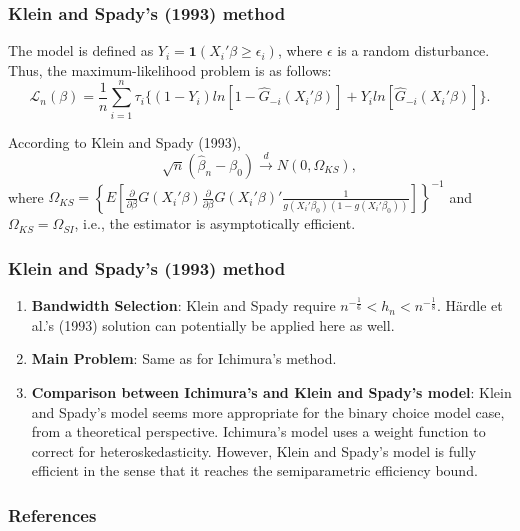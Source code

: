 \documentclass[11pt]{beamer}
\begin{document}
\begin{frame}[t]
    \frametitle{Klein and Spady's (1993) method}
The model is defined as $Y_i =  \mathbf{1}{(X_i'\beta \geq \epsilon_i)}$, where $\epsilon$ is a random disturbance.
Thus, the maximum-likelihood problem is as follows:
\begin{equation}
\mathcal{L}_n(\beta) = \frac{1}{n}\sum_{i=1}^n \tau_{i}\{ (1 - Y_i)ln[ 1 - \hat{G}_{-i}(X_i'\beta)] +  Y_iln[\hat{G}_{-i}(X_i'\beta)]\}.
\end{equation}
\begin{theorem}
According to Klein and Spady (1993),
\[\sqrt{n}(\hat{\beta}_{n} - \beta_0) \stackrel{d}{\rightarrow} N(0,\Omega_{KS}),
\]
where $ \Omega_{KS} = \left\{ E\left[\frac{\partial}{\partial \beta}
 G(X_i'\beta)\frac{\partial}{\partial \beta} G(X_i'\beta)'\frac{1}{g(X_i'\beta_0)(1 - g(X_i'\beta_0))} \right]\right\}^{-1} $
 and $\Omega_{KS} = \Omega_{SI}$, i.e., the estimator is asymptotically efficient.

\end{theorem}
\end{frame}

\begin{frame}[t]
    \frametitle{Klein and Spady's (1993) method}

\begin{enumerate}
	\item \textbf{Bandwidth Selection}: Klein and Spady require $ n^{-\frac{1}{6}} < h_n < n^{-\frac{1}{8}}$. H{\"a}rdle et al.'s (1993) solution can potentially be applied here as well.
	\item \textbf{Main Problem}: Same as for Ichimura's method.
	\item \textbf{Comparison between Ichimura's and Klein and Spady's model}:
	Klein and Spady's model seems more appropriate for the binary choice model case, from a theoretical perspective. Ichimura's model uses a weight function to correct for heteroskedasticity. However, Klein and Spady's model is fully efficient in the sense that it reaches the semiparametric efficiency bound.
\end{enumerate}
\end{frame}
 {
    \begin{frame}
        \frametitle{}
    \end{frame}

}

\begin{frame}[allowframebreaks]
    \frametitle{References}
    \renewcommand{\bibfont}{\normalfont\footnotesize}
    \printbibliography
\end{frame}
\end{document}
